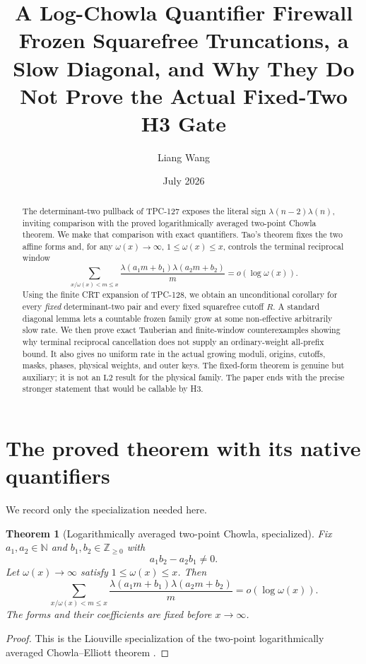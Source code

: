 \documentclass[11pt]{article}
\title{\textbf{A Log-Chowla Quantifier Firewall}\\
\large Frozen Squarefree Truncations, a Slow Diagonal, and Why They
Do Not Prove the Actual Fixed-Two H3 Gate}
\author{Liang Wang}
\date{July 2026}
\newtheorem{theorem}{Theorem}[section]
\theoremstyle{definition}
\theoremstyle{remark}
\newcommand{\Ltwo}{\mathrm{L2}}
\begin{document}
\maketitle

\begin{abstract}
The determinant-two pullback of TPC-127 exposes the literal sign
\(\lambda(n-2)\lambda(n)\), inviting comparison with the proved
logarithmically averaged two-point Chowla theorem.  We make that
comparison with exact quantifiers.  Tao's theorem fixes the two
affine forms and, for any
\(\omega(x)\to\infty\), \(1\le\omega(x)\le x\), controls the
terminal reciprocal window
\[
 \sum_{x/\omega(x)<m\le x}
 \frac{\lambda(a_1m+b_1)\lambda(a_2m+b_2)}m
 =o(\log\omega(x)).
\]
Using the finite CRT expansion of TPC-128, we obtain an unconditional
corollary for every \emph{fixed} determinant-two pair and every
fixed squarefree cutoff \(R\).  A standard diagonal lemma lets a
countable frozen family grow at some non-effective arbitrarily slow
rate.  We then prove exact Tauberian and finite-window counterexamples
showing why terminal reciprocal cancellation does not supply an
ordinary-weight all-prefix bound.  It also gives no uniform rate in
the actual growing moduli, origins, cutoffs, masks, phases, physical
weights, and outer keys.  The fixed-form theorem is genuine but
auxiliary; it is not an \(\Ltwo\) result for the physical family.
The paper ends with the precise stronger statement that would be
callable by H3.
\end{abstract}

\section{The proved theorem with its native quantifiers}

We record only the specialization needed here.

\begin{theorem}[Logarithmically averaged two-point Chowla,
specialized]
\label{thm:tao}
Fix \(a_1,a_2\in\mathbb N\) and \(b_1,b_2\in\mathbb Z_{\ge0}\) with
\[
 a_1b_2-a_2b_1\ne0.
\]
Let \(\omega(x)\to\infty\) satisfy \(1\le\omega(x)\le x\).  Then
\begin{equation}
 \sum_{x/\omega(x)<m\le x}
 \frac{\lambda(a_1m+b_1)\lambda(a_2m+b_2)}m
 =
 o(\log\omega(x)).
\label{eq:tao}
\end{equation}
The forms and their coefficients are fixed before \(x\to\infty\).
\end{theorem}

\begin{proof}
This is the Liouville specialization of the two-point logarithmically
averaged Chowla--Elliott theorem
\citep{Tao2016LogChowla}.
\end{proof}
\end{document}

